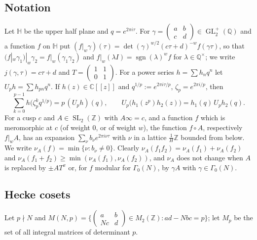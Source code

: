 \documentclass[11pt,a4paper]{article}
\theoremstyle{definition}\newtheorem{definition}[theorem]{Definition}
\theoremstyle{remark}\newtheorem{remark}[theorem]{Remark}
\newcommand{\Z}{\mathbb Z}
\newcommand{\Q}{\mathbb Q}
\newcommand{\C}{\mathbb C}
\newcommand{\Hb}{\mathbb H}
\DeclareMathOperator{\SL}{SL}
\DeclareMathOperator{\GL}{GL}
\newcommand{\bmat}[4]{\left(\begin{smallmatrix}#1&#2\\#3&#4\end{smallmatrix}\right)}
\numberwithin{equation}{section}
\begin{document}
\subsection{Notation}
Let $\Hb$ be the upper half plane and $q=e^{2\pi i\tau}$. For $\gamma=\bmat abcd\in\GL_2^+(\Q)$ and a
function $f$ on $\Hb$ put $(f|_w\gamma)(\tau)=\det(\gamma)^{w/2}(c\tau+d)^{-w}f(\gamma\tau)$, so that
$(f|_w\gamma_1)|_w\gamma_2=f|_w(\gamma_1\gamma_2)$ and $f|_w(\lambda I)=\operatorname{sgn}(\lambda)^wf$
for $\lambda\in\Q^\times$; we write $j(\gamma,\tau)=c\tau+d$ and $T=\bmat1101$. For a power series
$h=\sum h_nq^n$ let $U_ph=\sum h_{pn}q^n$. If $h(z)\in\C[[z]]$ and $q^{1/p}:=e^{2\pi i\tau/p}$,
$\zeta_p=e^{2\pi i/p}$, then
\begin{equation}\label{B:eq:Up}
\sum_{k=0}^{p-1}h\bigl(\zeta_p^kq^{1/p}\bigr)=p\,(U_ph)(q),\qquad U_p\bigl(h_1(z^p)h_2(z)\bigr)=h_1(q)\,U_ph_2(q).
\end{equation}
For a cusp $c$ and $A\in\SL_2(\Z)$ with $A\infty=c$, and a function $f$ which is meromorphic at
$c$ (of weight $0$, or of weight $w$), the function $f\circ A$, respectively $f|_wA$, has an
expansion $\sum_{\nu}b_\nu e^{2\pi i\nu\tau}$ with $\nu$ in a lattice $\frac1H\Z$ bounded from below.
We write $\nu_A(f)=\min\{\nu:b_\nu\ne0\}$. Clearly $\nu_A(f_1f_2)=\nu_A(f_1)+\nu_A(f_2)$ and
$\nu_A(f_1+f_2)\ge\min(\nu_A(f_1),\nu_A(f_2))$, and $\nu_A$ does not change when $A$ is replaced by
$\pm AT^x$ or, for $f$ modular for $\Gamma_0(N)$, by $\gamma A$ with $\gamma\in\Gamma_0(N)$.

\subsection{Hecke cosets}
Let $p\nmid N$ and
$M(N,p)=\bigl\{\bmat ab{Nc}d\in M_2(\Z):ad-Nbc=p\bigr\}$; let $M_p$ be the set of all integral
matrices of determinant $p$.
\end{document}
